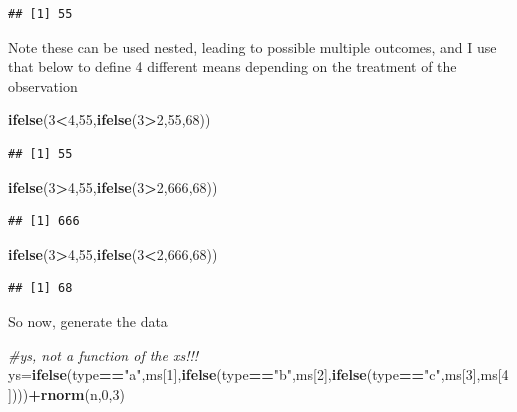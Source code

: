 \documentclass[
]{book}
\newenvironment{Shaded}{\begin{snugshade}}{\end{snugshade}}
\newcommand{\CommentTok}[1]{\textcolor[rgb]{0.56,0.35,0.01}{\textit{#1}}}
\newcommand{\DecValTok}[1]{\textcolor[rgb]{0.00,0.00,0.81}{#1}}
\newcommand{\KeywordTok}[1]{\textcolor[rgb]{0.13,0.29,0.53}{\textbf{#1}}}
\newcommand{\NormalTok}[1]{#1}
\newcommand{\OperatorTok}[1]{\textcolor[rgb]{0.81,0.36,0.00}{\textbf{#1}}}
\newcommand{\StringTok}[1]{\textcolor[rgb]{0.31,0.60,0.02}{#1}}
\begin{document}
\begin{verbatim}
## [1] 55
\end{verbatim}

Note these can be used nested, leading to possible multiple outcomes, and I use that below to define 4 different means depending on the treatment of the observation

\begin{Shaded}
\begin{Highlighting}[]
\KeywordTok{ifelse}\NormalTok{(}\DecValTok{3}\OperatorTok{<}\DecValTok{4}\NormalTok{,}\DecValTok{55}\NormalTok{,}\KeywordTok{ifelse}\NormalTok{(}\DecValTok{3}\OperatorTok{>}\DecValTok{2}\NormalTok{,}\DecValTok{55}\NormalTok{,}\DecValTok{68}\NormalTok{))}
\end{Highlighting}
\end{Shaded}

\begin{verbatim}
## [1] 55
\end{verbatim}

\begin{Shaded}
\begin{Highlighting}[]
\KeywordTok{ifelse}\NormalTok{(}\DecValTok{3}\OperatorTok{>}\DecValTok{4}\NormalTok{,}\DecValTok{55}\NormalTok{,}\KeywordTok{ifelse}\NormalTok{(}\DecValTok{3}\OperatorTok{>}\DecValTok{2}\NormalTok{,}\DecValTok{666}\NormalTok{,}\DecValTok{68}\NormalTok{))}
\end{Highlighting}
\end{Shaded}

\begin{verbatim}
## [1] 666
\end{verbatim}

\begin{Shaded}
\begin{Highlighting}[]
\KeywordTok{ifelse}\NormalTok{(}\DecValTok{3}\OperatorTok{>}\DecValTok{4}\NormalTok{,}\DecValTok{55}\NormalTok{,}\KeywordTok{ifelse}\NormalTok{(}\DecValTok{3}\OperatorTok{<}\DecValTok{2}\NormalTok{,}\DecValTok{666}\NormalTok{,}\DecValTok{68}\NormalTok{))}
\end{Highlighting}
\end{Shaded}

\begin{verbatim}
## [1] 68
\end{verbatim}

So now, generate the data

\begin{Shaded}
\begin{Highlighting}[]
\CommentTok{#ys, not a function of the xs!!!}
\NormalTok{ys=}\KeywordTok{ifelse}\NormalTok{(type}\OperatorTok{==}\StringTok{"a"}\NormalTok{,ms[}\DecValTok{1}\NormalTok{],}\KeywordTok{ifelse}\NormalTok{(type}\OperatorTok{==}\StringTok{"b"}\NormalTok{,ms[}\DecValTok{2}\NormalTok{],}\KeywordTok{ifelse}\NormalTok{(type}\OperatorTok{==}\StringTok{"c"}\NormalTok{,ms[}\DecValTok{3}\NormalTok{],ms[}\DecValTok{4}\NormalTok{])))}\OperatorTok{+}\KeywordTok{rnorm}\NormalTok{(n,}\DecValTok{0}\NormalTok{,}\DecValTok{3}\NormalTok{)}
\end{Highlighting}
\end{Shaded}
\end{document}
